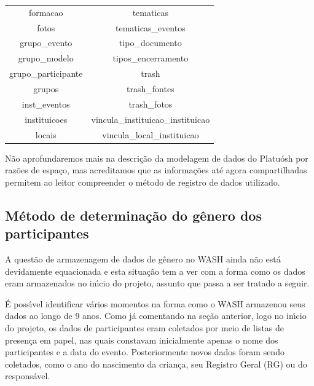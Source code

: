 \documentclass[
12pt,		%
openright,	%
twoside,  %
a4paper,			%
chapter=TITLE,		%
english,			%
french,				%
spanish,			%
brazil				%
]{USPSC-classe/USPSC_RedarTex}
\begin{document}
\begin{table}[htb]
\begin{tabular}{|c|c|}
 formacao                       &   tematicas \\
 fotos                          &   tematicas\_eventos \\
 grupo\_evento                   &   tipo\_documento \\
 grupo\_modelo                   &   tipos\_encerramento \\
 grupo\_participante             &   trash \\
 grupos                         &   trash\_fontes \\
 inst\_eventos                   &   trash\_fotos \\
 instituicoes                   &   vincula\_instituicao\_instituicao \\
 locais                         &   vincula\_local\_instituicao \\
\hline
\end{tabular}
\end{table}


N\~ao aprofundaremos mais na descri\c{c}\~ao da modelagem de dados do Platu\'osh por raz\~oes de espa\c{c}o, mas acreditamos que as informa\c{c}\~oes at\'e agora compartilhadas permitem ao leitor compreender o m\'etodo de registro de dados utilizado.










\subsection[M\'etodo de determina\c{c}\~ao do g\^enero dos participantes]{M\'etodo de determina\c{c}\~ao do g\^enero dos participantes}\label{M\'etodo de determina\c{c}\~ao do g\^enero dos participantes}
A quest\~ao de armazenagem de dados de g\^enero no WASH ainda n\~ao est\'a devidamente equacionada e esta situa\c{c}\~ao tem a ver com a forma como os dados eram armazenados no in\'{\i}cio do projeto, assunto que passa a ser tratado a seguir.










\'E poss\'{\i}vel identificar v\'arios momentos na forma como o WASH armazenou seus dados ao longo de 9 anos. Como j\'a comentando na se\c{c}\~ao anterior, logo no in\'{\i}cio do projeto, os dados de participantes eram coletados por meio de listas de presen\c{c}a em papel, nas quais constavam inicialmente apenas o nome dos participantes e a data do evento. Posteriormente novos dados foram sendo coletados, como o ano do nascimento da crian\c{c}a, seu Registro Geral (RG) ou do respons\'avel.
\end{document}
